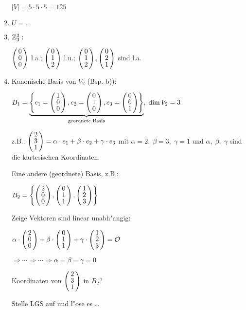 \begin{enumerate}
	$|V| = 5 \cdot 5 \cdot 5 = 125$
	\item 
	$U = \dots$ %
 
	 \item
	 $\mathbb{Z}_3^3:$
	 
	 $\vct{0 \\ 0 \\ 0}$ l.a.; $\vct{0 \\ 1 \\2}$ l.u.; $\vct{0 \\ 1 \\ 2}, \vct{0 \\ 2 \\ 1}$ sind l.a.
	 \item
	 Kanonische Basis von $V_2$ (Bsp. b)):
	 
	 $B_1 = \underbrace{\aset{e_1 = \vct{1 \\ 0 \\ 0}, e_2 = \vct{0 \\ 1 \\ 0}, e_3= \vct{0 \\ 0 \\ 1}}}_{\text{geordnete Basis}},\; \dim V_2 = 3$
	 
	 z.B.: $\vct{2 \\ 3 \\ 1}= \alpha \cdot e_1 + \beta \cdot e_2 + \gamma \cdot e_3$ mit $\alpha = 2, \;\beta = 3, \;\gamma =1 $ und $\alpha, \; \beta, \; \gamma $ sind die kartesischen Koordinaten.
	 
	 Eine andere (geordnete) Basis, z.B.:
	 
	 $B_2 = \aset {\vct{2 \\ 0 \\ 0}, \vct{0 \\ 1 \\ 1}, \vct{1 \\2 \\ 3}}$
	 
	 Zeige Vektoren sind linear unabh"angig:
	 
	 $\alpha \cdot \vct{2 \\ 0 \\ 0} + \beta \cdot \vct{0 \\  1\\ 1} + \gamma \cdot \vct{1 \\ 2 \\ 3} = \zerovec$
	 
	 $\Rightarrow  \cdots  \Rightarrow \cdots \Rightarrow \alpha = \beta = \gamma = 0$
	 
	 Koordinaten von $\vct{2 \\ 3 \\ 1}$ in $B_2$?
	 
	 Stelle LGS auf und l"ose es \dots
	 \end{enumerate}

